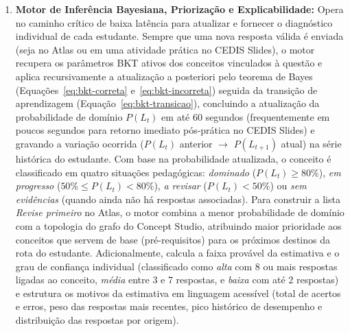 \begin{enumerate}
    \item \textbf{Motor de Inferência Bayesiana, Priorização e Explicabilidade:} Opera no caminho crítico de baixa latência para atualizar e fornecer o diagnóstico individual de cada estudante. Sempre que uma nova resposta válida é enviada (seja no Atlas ou em uma atividade prática no CEDIS Slides), o motor recupera os parâmetros BKT ativos dos conceitos vinculados à questão e aplica recursivamente a atualização a posteriori pelo teorema de Bayes (Equações~\ref{eq:bkt-correta} e~\ref{eq:bkt-incorreta}) seguida da transição de aprendizagem (Equação~\ref{eq:bkt-transicao}), concluindo a atualização da probabilidade de domínio $P(L_t)$ em até 60 segundos (frequentemente em poucos segundos para retorno imediato pós-prática no CEDIS Slides) e gravando a variação ocorrida ($P(L_t)$ anterior $\rightarrow$ $P(L_{t+1})$ atual) na série histórica do estudante. Com base na probabilidade atualizada, o conceito é classificado em quatro situações pedagógicas: \textit{dominado} ($P(L_t) \ge 80\%$), \textit{em progresso} ($50\% \le P(L_t) < 80\%$), \textit{a revisar} ($P(L_t) < 50\%$) ou \textit{sem evidências} (quando ainda não há respostas associadas). Para construir a lista \textit{Revise primeiro} no Atlas, o motor combina a menor probabilidade de domínio com a topologia do grafo do Concept Studio, atribuindo maior prioridade aos conceitos que servem de base (pré-requisitos) para os próximos destinos da rota do estudante. Adicionalmente, calcula a faixa provável da estimativa e o grau de confiança individual (classificado como \textit{alta} com 8 ou mais respostas ligadas ao conceito, \textit{média} entre 3 e 7 respostas, e \textit{baixa} com até 2 respostas) e estrutura os motivos da estimativa em linguagem acessível (total de acertos e erros, peso das respostas mais recentes, pico histórico de desempenho e distribuição das respostas por origem).


\end{enumerate}
